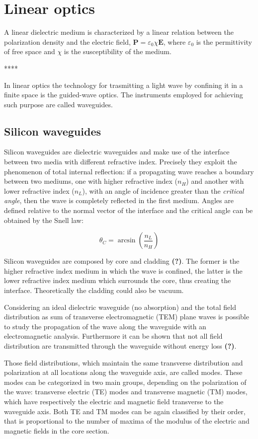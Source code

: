 \documentclass[12pt,a4paper,twocolumn,twoside]{article}
\begin{document}
\section{Linear optics}

A linear dielectric medium is characterized by a linear relation between the polarization density and the electric field, $\textbf{P} = \varepsilon_0 \chi \textbf{E}$, where $\varepsilon_0$ is the permittivity of free space and $\chi$ is the susceptibility of the medium.

****

In linear optics the technology for trasmitting a light wave by confining it in a finite space is the guided-wave optics.
The instruments employed for achieving such purpose are called waveguides.
\subsection{Silicon waveguides}
Silicon waveguides are dielectric waveguides and make use of the interface between two media with different refractive index.
Precisely they exploit the phenomenon of total internal reflection: if a propagating wave reaches a boundary between two mediums, one with higher refractive index ($n_H$) and another with lower refractive index ($n_L$), with an angle of incidence greater than the \textit{critical angle}, then the wave is completely reflected in the first medium.
Angles are defined relative to the normal vector of the interface and the critical angle can be obtained by the Snell law:

$$	\theta_C = \arcsin \left( \frac{n_L}{n_H} \right)$$

Silicon waveguides are composed by core and cladding \textbf{(?)}. %
The former is the higher refractive index medium in which the wave is confined, the latter is the lower refractive index medium which surrounds the core, thus creating the interface. Theoretically the cladding could also be vacuum.

Considering an ideal dielectric waveguide (no absorption) and the total field distribution as sum of transverse electromagnetic (TEM) plane waves is possible to study the propagation of the wave along the waveguide with an electromagnetic analysis.
Furthermore it can be shown that not all field distribution are transmitted through the waveguide without energy loss \textbf{(?)}.

Those field distributions, which maintain the same transverse distribution and polarization at all locations along the waveguide axis, are called modes.
These modes can be categorized in two main groups, depending on the polarization of the wave: transverse electric (TE) modes and transverse magnetic (TM) modes, which have respectively the electric and magnetic field transverse to the waveguide axis.
Both TE and TM modes can be again classified by their order, that is proportional to the number of maxima of the modulus of the electric and magnetic fields in the core section.
\end{document}
